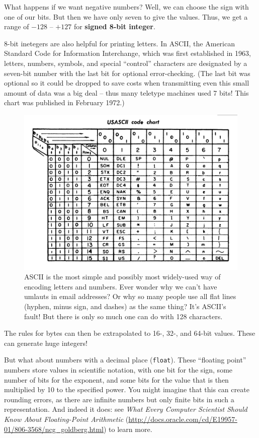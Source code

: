 \documentclass[a4paper,10pt]{scrartcl}
\begin{document}
What happens if we want negative numbers? Well, we can choose the sign with one of our bits. But then we have only seven to give the values. Thus, we get a range of $-128$ -- $+127$ for \textbf{signed 8-bit integer}.

8-bit inetegers are also helpful for printing letters. In ASCII, the American Standard Code for Information Interchange, which was first established in 1963, letters, numbers, symbols, and special ``control'' characters are designated by a seven-bit number with the last bit for optional error-checking. (The last bit was optional so it could be dropped to save costs when transmitting even this small amount of data was a big deal -- thus many teletype machines used 7 bits! This chart was published in February 1972.)

\begin{figure}[h!]
\begin{center}
\includegraphics[width=.8\linewidth]{figures/Introduction/ASCII_Code_Chart-Quick_ref_card.png}
\end{center}
\caption{ASCII is the most simple and possibly most widely-used way of encoding letters and numbers. Ever wonder why we can't have umlauts in email addresses? Or why so many people use all flat lines (hyphen, minus sign, and dashes) as the same thing? It's ASCII's fault! But there is only so much one can do with 128 characters.}
\end{figure}

The rules for bytes can then be extrapolated to 16-, 32-, and 64-bit values. These can generate huge integers!

But what about numbers with a decimal place (\lstinline{float}). These ``floating point'' numbers store values in scientific notation, with one bit for the sign, some number of bits for the exponent, and some bits for the value that is then multiplied by 10 to the specified power. You might imagine that this can create rounding errors, as there are infinite numbers but only finite bits in such a representation. And indeed it does: see \emph{What Every Computer Scientist Should Know About Floating-Point Arithmetic} (\url{http://docs.oracle.com/cd/E19957-01/806-3568/ncg_goldberg.html}) to learn more.
\end{document}
